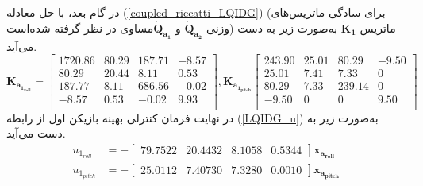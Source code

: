 در گام بعد، با حل معادله
(\ref{coupled_riccatti_LQIDG})
(برای سادگی ماتریس‌های وزنی $\boldsymbol{\dot{Q}_{a_2}}$ و $\boldsymbol{\dot{Q}_{a_1}}$مساوی در نظر گرفته شده‌است)
ماتریس
$\boldsymbol{\dot{K}_1}$
به‌صورت زیر به دست می‌آید.
\begin{equation}
	\boldsymbol{K_{a_{1_{roll}}}} = \begin{bmatrix}
1720.86 & 80.29 & 187.71 & -8.57 \\
80.29 & 20.44 & 8.11 & 0.53 \\
187.77 & 8.11 & 686.56 & -0.02 \\
-8.57 & 0.53 & -0.02 & 9.93 \\
	\end{bmatrix}, \boldsymbol{K_{a_{1_{pitch}}}} \begin{bmatrix}
243.90 & 25.01 & 80.29 & -9.50 \\
25.01 & 7.41 & 7.33 & 0 \\
80.29 & 7.33 & 239.14 & 0 \\
-9.50 & 0 & 0 & 9.50 \\
\end{bmatrix}
\end{equation}
در نهایت فرمان کنترلی بهینه بازیکن اول از رابطه
(\ref{LQIDG_u})
به‌صورت زیر به دست می‌آید.
\begin{equation}
	\begin{split}
		u_{1_{roll}} &= -\begin{bmatrix}
			79.7522 &20.4432 &8.1058 &0.5344 
		\end{bmatrix} \boldsymbol{x_{a_{roll}}} \\
	u_{1_{pitch}} &= -\begin{bmatrix}
		25.0112 &7.40730 &7.3280 &0.0010
	\end{bmatrix} \boldsymbol{x_{a_{pitch}}}
	\end{split}
\end{equation}
%	
